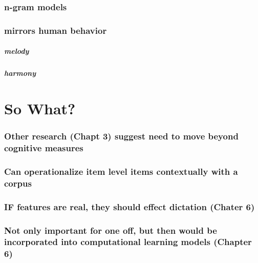 \documentclass[]{book}
\let\oldsubparagraph\subparagraph
\renewcommand{\subparagraph}[1]{\oldsubparagraph{#1}\mbox{}}
\theoremstyle{definition}
\theoremstyle{definition}
\theoremstyle{definition}
\theoremstyle{remark}
\begin{document}
\hypertarget{n-gram-models}{%
\subsubsection{n-gram models}\label{n-gram-models}}

\hypertarget{mirrors-human-behavior}{%
\subsubsection{mirrors human behavior}\label{mirrors-human-behavior}}

\hypertarget{melody}{%
\subparagraph{melody}\label{melody}}

\hypertarget{harmony}{%
\subparagraph{harmony}\label{harmony}}

\hypertarget{so-what}{%
\section{So What?}\label{so-what}}

\hypertarget{other-research-chapt-3-suggest-need-to-move-beyond-cognitive-measures}{%
\subsubsection{Other research (Chapt 3) suggest need to move beyond
cognitive
measures}\label{other-research-chapt-3-suggest-need-to-move-beyond-cognitive-measures}}

\hypertarget{can-operationalize-item-level-items-contextually-with-a-corpus}{%
\subsubsection{Can operationalize item level items contextually with a
corpus}\label{can-operationalize-item-level-items-contextually-with-a-corpus}}

\hypertarget{if-features-are-real-they-should-effect-dictation-chater-6}{%
\subsubsection{IF features are real, they should effect dictation
(Chater
6)}\label{if-features-are-real-they-should-effect-dictation-chater-6}}

\hypertarget{not-only-important-for-one-off-but-then-would-be-incorporated-into-computational-learning-models-chapter-6}{%
\subsubsection{Not only important for one off, but then would be
incorporated into computational learning models (Chapter
6)}\label{not-only-important-for-one-off-but-then-would-be-incorporated-into-computational-learning-models-chapter-6}}
\end{document}
